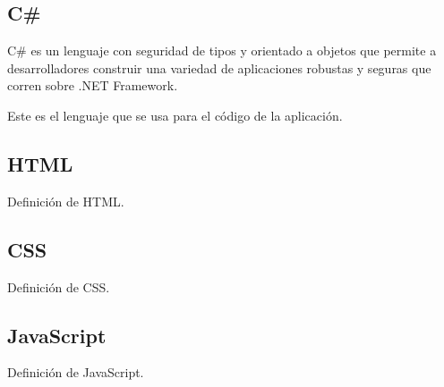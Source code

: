 \subsection{C\#}
C\# es un lenguaje con seguridad de tipos y orientado a objetos que permite a desarrolladores construir una variedad de aplicaciones robustas y seguras que corren sobre .NET Framework. \cite{}

Este es el lenguaje que se usa para el código de la aplicación.

\subsection{HTML}
Definición de HTML.

\subsection{CSS}
Definición de CSS.

\subsection{JavaScript}
Definición de JavaScript.